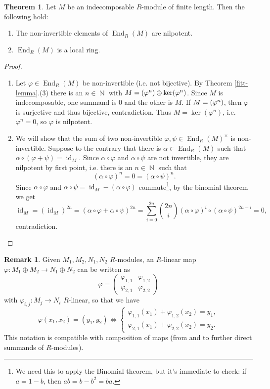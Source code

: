 \documentclass[12pt,a4paper]{report}
\theoremstyle{definition}
\newtheorem{theorem}{Theorem}[chapter] %
\newtheorem*{remark}{Remark}
\theoremstyle{num.custom-title}
\DeclareMathOperator{\id}{id}
\let\o\relax %
\DeclareMathOperator{\o}{\mathsf{o}}
\let\Im\relax %
\DeclareMathOperator{\Im}{Im}
\DeclareMathOperator{\End}{End}
\DeclareMathOperator{\N}{\mathbb{N}}
\newcommand{\IFF}{\Longleftrightarrow}
\renewcommand{\phi}{\varphi}
\begin{document}
\begin{theorem}\label{thm_fin-length_local-ring-end}
Let $M$ be an indecomposable $R$-module of finite length. Then the following hold:
\begin{enumerate}
\item The non-invertible elements of $\End_R(M)$ are nilpotent.
\item $\End_R(M)$ is a local ring.
\end{enumerate}
\begin{proof}\ 
\begin{enumerate}
\item Let $\phi \in \End_R(M)$ be non-invertible (i.e. not bijective). By Theorem \ref{fitt-lemma}.(3) there is an $n \in \N$ with $M=\Im(\phi^n) \oplus \ker(\phi^n)$. Since $M$ is indecomposable, one summand is $0$ and the other is $M$. If $M=\Im(\phi^n)$, then $\phi$ is surjective and thus bijective, contradiction. Thus $M=\ker(\phi^n)$, i.e. $\phi^n=0$, so $\phi$ is nilpotent.
\item We will show that the sum of two non-invertible $\phi,\psi \in \End_R(M)^\times$ is non-invertible. Suppose to the contrary that there is $\alpha \in \End_R(M)$ such that $\alpha \circ (\phi+\psi)=\id_M$. Since $\alpha \circ \phi$ and $\alpha \circ \psi$ are not invertible, they are nilpotent by first point, i.e. there is an $n \in \N$ such that
\[
(\alpha \circ \phi)^n = 0 = (\alpha \circ \psi)^n.
\]
Since $\alpha \circ \phi$ and $\alpha \circ \psi = \id_M-(\alpha \circ \phi)$ commute\footnote{We need this to apply the Binomial theorem, but it's immediate to check: if $a=1-b$, then $ab=b-b^2=ba$.}, by the binomial theorem we get
\[
\id_M = (\id_M)^{2n} = (\alpha \circ \phi + \alpha \circ \psi)^{2n} = \sum_{i=0}^{2n} \binom{2n}{i} (\alpha \circ \phi)^i \circ (\alpha \circ \psi)^{2n-i} = 0,
\]
contradiction.
\end{enumerate}
\end{proof}
\end{theorem}

\begin{remark}
Given $M_1,M_2,N_1,N_2$ $R$-modules, an $R$-linear map $\phi : M_1 \oplus M_2 \to N_1 \oplus N_2$ can be written as
\[
\phi = 
\begin{pmatrix}
\phi_{1,1} & \phi_{1,2} \\
\phi_{2,1} & \phi_{2,2}
\end{pmatrix}
\]
with $\phi_{i,j} : M_j \to N_i$ $R$-linear, so that we have
\[
\phi(x_1,x_2) = (y_1,y_2) \IFF 
\begin{cases}
\phi_{1,1}(x_1) + \phi_{1,2}(x_2) = y_1, \\
\phi_{2,1}(x_1) + \phi_{2,2}(x_2) = y_2.
\end{cases}
\]
This notation is compatible with composition of maps (from and to further direct summands of $R$-modules).
\end{remark}
\end{document}
